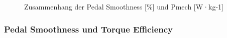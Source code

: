 \documentclass[
  letterpaper,
  DIV=11]{scrartcl}
\begin{document}
\begin{figure}


\caption{\label{fig-PS_P_mech}Zusammenhang der Pedal Smoothness {[}\%{]}
und Pmech {[}W·kg-1{]}}

\end{figure}%

\subsubsection{Pedal Smoothness und Torque Efficiency}
\end{document}
